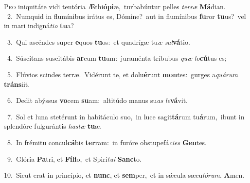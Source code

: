 \lettrine{\initial\textcolor{\initialcolor}{P}}{ro} iniquitáte vidi tentória \textbf{Æ}\-thi\-\textbf{ó}\-\textbf{pi}æ,~\star turbabúntur pelles \textit{ter}\-\textit{ræ} \textbf{Má}\-dian.\\
{\numbfont\textcolor{\numbcolor}{~2.}}~Numquid in flumínibus irátus es, Dómine?~\dagger aut in flumínibus \textbf{fu}\-ror \textbf{tu}\-us?~\star vel in mari indigná\-\textit{ti}\-\textit{o} \textbf{tu}\-a?\par
{\numbfont\textcolor{\numbcolor}{~3.}}~Qui ascéndes super \textbf{e}\-quos \textbf{tu}\-os:~\star et quadrígæ tu\textit{æ} \textit{sal}\-\textbf{vá}tio.\par
{\numbfont\textcolor{\numbcolor}{~4.}}~Súscitans suscitábis \textbf{ar}\-cum \textbf{tu}\-um:~\star juraménta tríbubus \textit{quæ} \textit{lo}\-\textbf{cú}tus es;\par
{\numbfont\textcolor{\numbcolor}{~5.}}~Flúvios scindes terræ.~\dagger Vidérunt te, et dolu\-\textbf{é}\-runt \textbf{mon}\-tes:~\star gurges a\-\textit{quá}\-\textit{rum} \textbf{tráns}\-iit.\par
{\numbfont\textcolor{\numbcolor}{~6.}}~Dedit abýssus \textbf{vo}\-cem \textbf{su}\-am:~\star altitúdo manus su\textit{as} \textit{le}\-\textbf{vá}vit.\par
{\numbfont\textcolor{\numbcolor}{~7.}}~Sol et luna stetérunt in habitáculo suo,~\dagger in luce sagit\-\textbf{tá}\-rum tu\-\textbf{á}\-rum,~\star ibunt in splendóre fulgurántis \textit{has}\-\textit{tæ} \textbf{tu}\-æ.\par
{\numbfont\textcolor{\numbcolor}{~8.}}~In frémitu concul\-\textbf{cá}\-bis \textbf{ter}\-ram:~\star in furóre obstupefá\-\textit{ci}\-\textit{es} \textbf{Gen}\-tes.\par
{\numbfont\textcolor{\numbcolor}{~9.}}~Glória \textbf{Pa}\-tri, et \textbf{Fí}\-\textbf{li}o,~\star et Spirí\-\textit{tu}\-\textit{i} \textbf{Sanc}\-to.\par
{\numbfont\textcolor{\numbcolor}{10.}}~Sicut erat in princípio, et \textbf{nunc}\-, et \textbf{sem}\-per,~\star et in sǽcula sæcu\-\textit{ló}\-\textit{rum}. \textbf{A}\-men.\par
